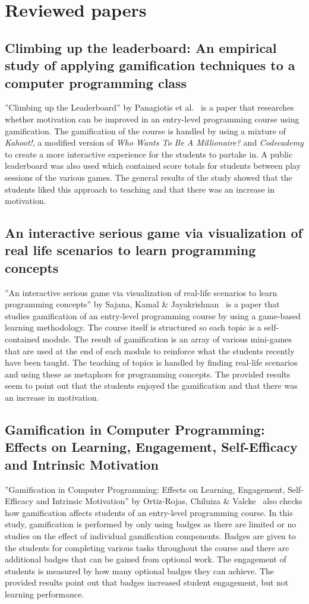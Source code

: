 \section{Reviewed papers}
\subsection{Climbing up the leaderboard: An empirical study of applying gamification techniques to a computer programming class}
''Climbing up the Leaderboard'' by Panagiotis et al.~\cite{panagiotis2016climbing} is a paper that researches whether motivation can be improved in an entry-level programming course using gamification. The gamification of the course is handled by using a mixture of \emph{Kahoot!}, a modified version of \emph{Who Wants To Be A Millionaire?} and \emph{Codecademy} to create a more interactive experience for the students to partake in. A public leaderboard was also used which contained score totals for students between play sessions of the various games. The general results of the study showed that the students liked this approach to teaching and that there was an increase in motivation. 
 
\subsection{An interactive serious game via visualization of real life scenarios to learn programming concepts}
''An interactive serious game via visualization of real-life scenarios to learn programming concepts'' by Sajana, Kamal \& Jayakrishnan~\cite{sajana2015interactive} is a paper that studies gamification of an entry-level programming course by using a game-based learning methodology. The course itself is structured so each topic is a self-contained module. The result of gamification is an array of various mini-games that are used at the end of each module to reinforce what the students recently have been taught. The teaching of topics is handled by finding real-life scenarios and using these as metaphors for programming concepts. The provided results seem to point out that the students enjoyed the gamification and that there was an increase in motivation. 

\subsection{Gamification in Computer Programming: Effects on Learning, Engagement, Self-Efficacy and Intrinsic Motivation}
''Gamification in Computer Programming: Effects on Learning, Engagement, Self-Efficacy and Intrinsic Motivation'' by Ortiz-Rojas, Chiluiza \& Valcke~\cite{ortiz2017gamification} also checks how gamification affects students of an entry-level programming course. In this study, gamification is performed by only using badges as there are limited or no studies on the effect of individual gamification components. Badges are given to the students for completing various tasks throughout the course and there are additional badges that can be gained from optional work. The engagement of students is measured by how many optional badges they can achieve. The provided results point out that badges increased student engagement, but not learning performance. 

